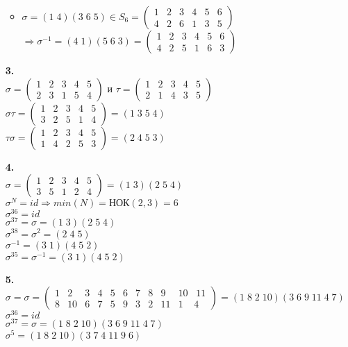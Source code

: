 \documentclass[a4paper]{article}
\newcommand{\mat}[1]{\begin{pmatrix} #1 \end{pmatrix}}
\renewcommand{\r}{\Rightarrow}
\begin{document}
\begin{enumerate}
\begin{itemize}
                  \item $\sigma = (1 \; 4)(3 \; 6 \; 5) \in S_6 = \mat{1 & 2 & 3 & 4 & 5 & 6\\ 4 & 2 & 6 & 1 & 3 & 5}$\\
                        $\r \sigma^{-1} = (4 \; 1)(5 \; 6 \; 3) = \mat{1 & 2 & 3 & 4 & 5 & 6 \\ 4 & 2 & 5 & 1 & 6 & 3}$
            \end{itemize}
      \item[\textbf{3.}]\indent \\
            $\sigma = \begin{pmatrix}1 & 2 & 3 & 4 & 5\\2 & 3 & 1 & 5 & 4\end{pmatrix} $ и $\tau = \begin{pmatrix}1 & 2 & 3 & 4 & 5\\2 & 1 & 4 & 3 & 5\end{pmatrix}$\\
            $\sigma \tau = \mat{1 & 2 & 3 & 4 & 5 \\ 3 & 2 & 5 & 1 & 4} = (1 \; 3 \; 5\; 4)$\\
            $\tau \sigma = \mat{1 & 2 & 3 & 4 & 5 \\ 1 & 4 & 2 & 5 & 3} = (2 \; 4 \; 5 \; 3)$

      \item[\textbf{4.}]\indent \\
            $\sigma = \begin{pmatrix}1 & 2 & 3 & 4 & 5 \\ 3 & 5 & 1 & 2 & 4\end{pmatrix} = (1 \; 3)(2 \; 5 \; 4)$\\
            $\sigma ^ N = id \r min(N) = \text{НОК}(2, 3) = 6$\\
            $\sigma^{36} = id$\\
            $\sigma^{37} = \sigma = (1 \; 3)(2 \; 5 \; 4)$\\
            $\sigma^{38} = \sigma^{2} = (2 \; 4 \; 5)$\\
            $\sigma^{-1} = (3 \; 1)(4 \; 5 \; 2)$\\
            $\sigma^{35} = \sigma^{-1} = (3 \; 1)(4 \; 5 \; 2)$

      \item[\textbf{5.}]\indent \\
            $\sigma = \sigma = \begin{pmatrix}1 & 2 & 3 & 4 & 5 & 6 & 7 & 8 & 9 & 10 \;\;\; 11\\ 8 & 10 & 6 & 7 & 5 & 9 & 3 & 2 & 11 & 1 \;\;\;\; 4\end{pmatrix}=(1 \; 8 \; 2 \; 10)(3 \; 6 \; 9 \; 11 \; 4 \; 7)$\\
            $\sigma^{36} = id$\\
            $\sigma^{37} = \sigma = (1 \; 8 \; 2 \; 10)(3 \; 6 \; 9 \; 11 \; 4 \; 7)$\\
            $\sigma^{5} = (1 \; 8 \; 2 \; 10)(3\; 7 \; 4 \; 11 \; 9 \; 6)$\\


\end{enumerate}
\end{document}
